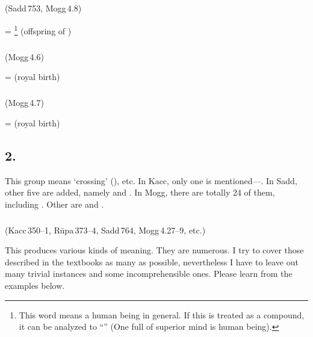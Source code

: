\subparagraph*{} (Sadd\,753, Mogg\,4.8)\label{pacct1:ussa}\label{pacct1:usadn}\label{pacct1:ssa}\label{pacct1:sadna}

 = \footnote{This word means a human being in general. If this is treated as a compound, it can be analyzed to ``'' (One full of superior mind is human being).} (offspring of ) \par

\subparagraph*{} (Mogg\,4.6)\label{pacct1:ynyna}

 =  (royal birth) \par

\subparagraph*{} (Mogg\,4.7)\label{pacct1:ya}\label{pacct1:iya}

 =  (royal birth) \par

\subsection*{2.\ }\label{tadgroup2}

This group means `crossing' (), etc. In Kacc, only one  is mentioned---. In Sadd, other five are added, namely  and . In Mogg, there are totally 24 of them, including . Other are  and .

\subparagraph*{} (Kacc\,350--1, R\=upa\,373--4, Sadd\,764, Mogg\,4.27--9, etc.)\label{pacct2:dnika}

This  produces various kinds of meaning. They are numerous. I try to cover those described in the textbooks as many as possible, nevertheless I have to leave out many trivial instances and some incomprehensible ones. Please learn from the examples below.

